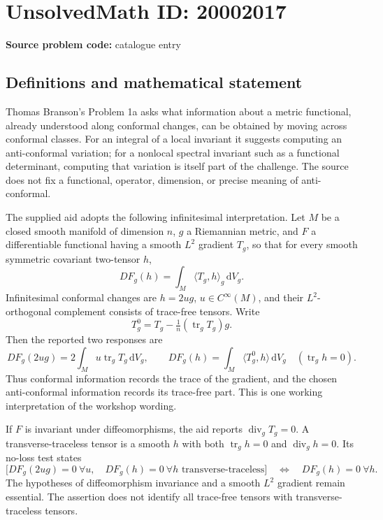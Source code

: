 \documentclass[11pt]{article}
\newcommand{\dd}{\,\mathrm{d}}
\begin{document}
\section*{UnsolvedMath ID: 20002017}
\textbf{Source problem code:} catalogue entry
\subsection{Definitions and mathematical statement}
Thomas Branson's Problem 1a asks what information about a metric functional, already understood along conformal changes, can be obtained by moving across conformal classes. For an integral of a local invariant it suggests computing an anti-conformal variation; for a nonlocal spectral invariant such as a functional determinant, computing that variation is itself part of the challenge. The source does not fix a functional, operator, dimension, or precise meaning of anti-conformal.

The supplied aid adopts the following infinitesimal interpretation. Let \(M\) be a closed smooth manifold of dimension \(n\), \(g\) a Riemannian metric, and \(F\) a differentiable functional having a smooth \(L^2\) gradient \(T_g\), so that for every smooth symmetric covariant two-tensor \(h\),
\[
 D F_g(h)=\int_M\langle T_g,h\rangle_g\dd V_g.
\]
Infinitesimal conformal changes are \(h=2ug\), \(u\in C^\infty(M)\), and their \(L^2\)-orthogonal complement consists of trace-free tensors. Write
\[
 T_g^0=T_g-\tfrac1n(\operatorname{tr}_gT_g)g.
\]
Then the reported two responses are
\[
 D F_g(2ug)=2\int_Mu\operatorname{tr}_gT_g\dd V_g,
 \qquad D F_g(h)=\int_M\langle T_g^0,h\rangle\dd V_g
 \quad(\operatorname{tr}_gh=0).
\]
Thus conformal information records the trace of the gradient, and the chosen anti-conformal information records its trace-free part. This is one working interpretation of the workshop wording.

If \(F\) is invariant under diffeomorphisms, the aid reports \(\operatorname{div}_gT_g=0\). A transverse-traceless tensor is a smooth \(h\) with both \(\operatorname{tr}_gh=0\) and \(\operatorname{div}_gh=0\). Its no-loss test states
\[
 \bigl[D F_g(2ug)=0\ \forall u,
 \quad D F_g(h)=0\ \forall h\text{ transverse-traceless}\bigr]
 \quad\Longleftrightarrow\quad D F_g(h)=0\ \forall h.
\]
The hypotheses of diffeomorphism invariance and a smooth \(L^2\) gradient remain essential. The assertion does not identify all trace-free tensors with transverse-traceless tensors.
\end{document}
